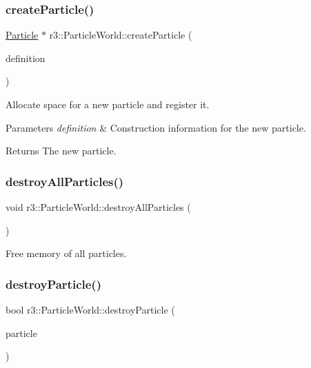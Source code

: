 \subsubsection{\texorpdfstring{create\+Particle()}{createParticle()}}
{\footnotesize\ttfamily \mbox{\hyperlink{classr3_1_1_particle}{Particle}} $\ast$ r3\+::\+Particle\+World\+::create\+Particle (\begin{DoxyParamCaption}\item[{\mbox{\hyperlink{structr3_1_1_particle_def}{Particle\+Def}}}]{definition }\end{DoxyParamCaption})}



Allocate space for a new particle and register it. 


\begin{DoxyParams}{Parameters}
{\em definition} & Construction information for the new particle. \\
\hline
\end{DoxyParams}
\begin{DoxyReturn}{Returns}
The new particle. 
\end{DoxyReturn}
\mbox{\label{classr3_1_1_particle_world_aa061b4eab09216fb7e3a8d08cbdb6dd2}} 
\subsubsection{\texorpdfstring{destroy\+All\+Particles()}{destroyAllParticles()}}
{\footnotesize\ttfamily void r3\+::\+Particle\+World\+::destroy\+All\+Particles (\begin{DoxyParamCaption}{ }\end{DoxyParamCaption})}



Free memory of all particles. 

\mbox{\label{classr3_1_1_particle_world_a1802231868ed6d99dd677ef71328781a}} 
\subsubsection{\texorpdfstring{destroy\+Particle()}{destroyParticle()}}
{\footnotesize\ttfamily bool r3\+::\+Particle\+World\+::destroy\+Particle (\begin{DoxyParamCaption}\item[{\mbox{\hyperlink{classr3_1_1_particle}{Particle}} $\ast$}]{particle }\end{DoxyParamCaption})}



